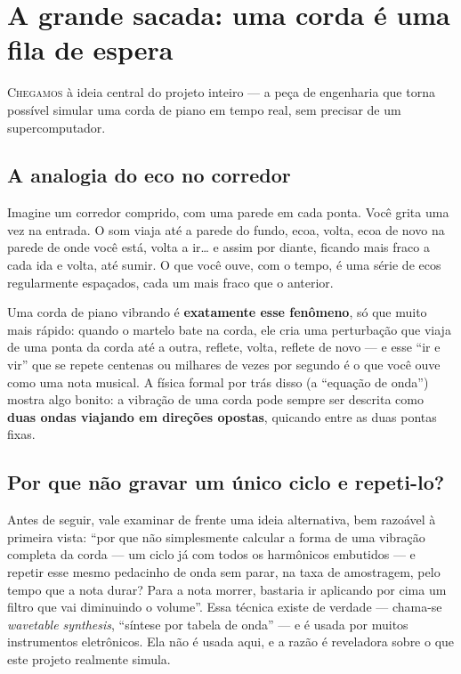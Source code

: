 \documentclass[11pt,oneside]{book}
\newcommand{\opening}[2]{\lettrine[lines=2,loversize=0.08,lraise=0.02]{#1}{#2}}
\begin{document}
\chapter{A grande sacada: uma corda é uma fila de espera}

\opening{C}{hegamos} à ideia central do projeto inteiro --- a peça de
engenharia que torna possível simular uma corda de piano em tempo real, sem
precisar de um supercomputador.

\section*{A analogia do eco no corredor}

Imagine um corredor comprido, com uma parede em cada ponta. Você grita uma
vez na entrada. O som viaja até a parede do fundo, ecoa, volta, ecoa de novo
na parede de onde você está, volta a ir\ldots{} e assim por diante, ficando
mais fraco a cada ida e volta, até sumir. O que você ouve, com o tempo, é
uma série de ecos regularmente espaçados, cada um mais fraco que o
anterior.

Uma corda de piano vibrando é \textbf{exatamente esse fenômeno}, só que
muito mais rápido: quando o martelo bate na corda, ele cria uma perturbação
que viaja de uma ponta da corda até a outra, reflete, volta, reflete de
novo --- e esse \enquote{ir e vir} que se repete centenas ou milhares de
vezes por segundo é o que você ouve como uma nota musical. A física formal
por trás disso (a \enquote{equação de onda}) mostra algo bonito: a vibração
de uma corda pode sempre ser descrita como \textbf{duas ondas viajando em
direções opostas}, quicando entre as duas pontas fixas.

\section*{Por que não gravar um único ciclo e repeti-lo?}

Antes de seguir, vale examinar de frente uma ideia alternativa, bem
razoável à primeira vista: \enquote{por que não simplesmente calcular a
forma de uma vibração completa da corda --- um ciclo já com todos os
harmônicos embutidos --- e repetir esse mesmo pedacinho de onda sem parar,
na taxa de amostragem, pelo tempo que a nota durar? Para a nota morrer,
bastaria ir aplicando por cima um filtro que vai diminuindo o volume}.
Essa técnica existe de verdade --- chama-se \emph{wavetable synthesis},
\enquote{síntese por tabela de onda} --- e é usada por muitos instrumentos
eletrônicos. Ela não é usada aqui, e a razão é reveladora sobre o que este
projeto realmente simula.
\end{document}
